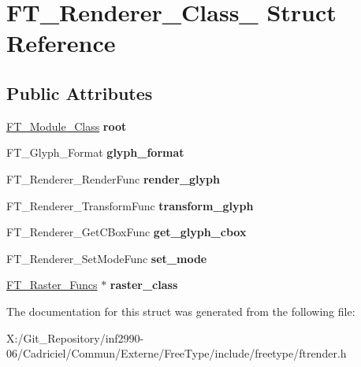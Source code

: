 \hypertarget{struct_f_t___renderer___class__}{\section{F\-T\-\_\-\-Renderer\-\_\-\-Class\-\_\- Struct Reference}
\label{struct_f_t___renderer___class__}
}
\subsection*{Public Attributes}
\begin{DoxyCompactItemize}
\item 
\hypertarget{struct_f_t___renderer___class___a3df4509f1de704596bf4237d6ff8cbd4}{\hyperlink{struct_f_t___module___class__}{F\-T\-\_\-\-Module\-\_\-\-Class} {\bfseries root}}\label{struct_f_t___renderer___class___a3df4509f1de704596bf4237d6ff8cbd4}

\item 
\hypertarget{struct_f_t___renderer___class___a2c8602452fae27379a6f85bbcb4b525c}{F\-T\-\_\-\-Glyph\-\_\-\-Format {\bfseries glyph\-\_\-format}}\label{struct_f_t___renderer___class___a2c8602452fae27379a6f85bbcb4b525c}

\item 
\hypertarget{struct_f_t___renderer___class___a7a022b8358ce3a06620c62f3542d0d2b}{F\-T\-\_\-\-Renderer\-\_\-\-Render\-Func {\bfseries render\-\_\-glyph}}\label{struct_f_t___renderer___class___a7a022b8358ce3a06620c62f3542d0d2b}

\item 
\hypertarget{struct_f_t___renderer___class___a2aef09ecdabacf5628ef29fb3d179def}{F\-T\-\_\-\-Renderer\-\_\-\-Transform\-Func {\bfseries transform\-\_\-glyph}}\label{struct_f_t___renderer___class___a2aef09ecdabacf5628ef29fb3d179def}

\item 
\hypertarget{struct_f_t___renderer___class___a4f9dc9b6d86504a8d3b04b4e72936e76}{F\-T\-\_\-\-Renderer\-\_\-\-Get\-C\-Box\-Func {\bfseries get\-\_\-glyph\-\_\-cbox}}\label{struct_f_t___renderer___class___a4f9dc9b6d86504a8d3b04b4e72936e76}

\item 
\hypertarget{struct_f_t___renderer___class___a7cfd4795107157aad4f7efcab77a0f64}{F\-T\-\_\-\-Renderer\-\_\-\-Set\-Mode\-Func {\bfseries set\-\_\-mode}}\label{struct_f_t___renderer___class___a7cfd4795107157aad4f7efcab77a0f64}

\item 
\hypertarget{struct_f_t___renderer___class___a5af75b9f582f98f9f74dbcbc530c7e88}{\hyperlink{struct_f_t___raster___funcs__}{F\-T\-\_\-\-Raster\-\_\-\-Funcs} $\ast$ {\bfseries raster\-\_\-class}}\label{struct_f_t___renderer___class___a5af75b9f582f98f9f74dbcbc530c7e88}

\end{DoxyCompactItemize}


The documentation for this struct was generated from the following file\-:\begin{DoxyCompactItemize}
\item 
X\-:/\-Git\-\_\-\-Repository/inf2990-\/06/\-Cadriciel/\-Commun/\-Externe/\-Free\-Type/include/freetype/ftrender.\-h\end{DoxyCompactItemize}
